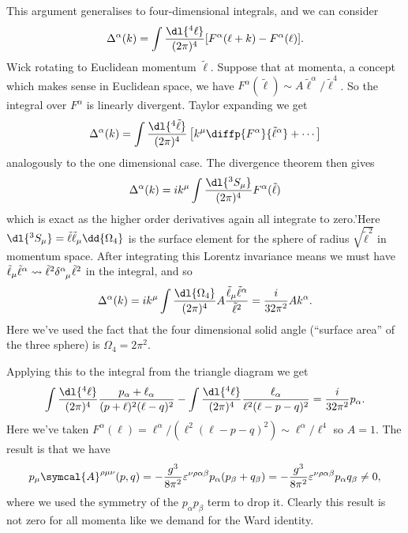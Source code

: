 \documentclass[fleqn]{NotesClass}
\newcommand{\amplitude}{\symcal{A}}
\begin{document}
    This argument generalises to four-dimensional integrals, and we can consider
    \begin{equation}
        \Delta^\alpha(k) = \int \frac{\dl{^4\ell}}{(2\pi)^4} [F^\alpha(\ell + k) - F^\alpha(\ell)].
    \end{equation}
    Wick rotating to Euclidean momentum \(\tilde{\ell}\). 
    Suppose that at momenta, a concept which makes sense in Euclidean space, we have \(F^\alpha(\tilde{\ell}) \sim A\tilde{\ell}^\alpha/\tilde{\ell}^4\).
    So the integral over \(F^\alpha\) is linearly divergent.
    Taylor expanding we get
    \begin{equation}
        \Delta^\alpha(k) = \int \frac{\dl{^4\tilde{\ell}}}{(2\pi)^4} \left[ k^\mu \diffp{F^\alpha}{\tilde{\ell}^\alpha}  + \dotsb \right]
    \end{equation}
    analogously to the one dimensional case.
    The divergence theorem then gives
    \begin{equation}
        \Delta^\alpha(k) = ik^\mu \int \frac{\dl{^3S_\mu}}{(2\pi)^4} F^\alpha(\tilde{\ell})
    \end{equation}
    which is exact as the higher order derivatives again all integrate to zero.'Here \(\dl{^3S_\mu} = \tilde{\ell}\tilde{\ell}_\mu \dd{\Omega_4}\) is the surface element for the sphere of radius \(\sqrt{\tilde{\ell}^2}\) in momentum space.
    After integrating this Lorentz invariance means we must have \(\tilde{\ell}_\mu \tilde{\ell}^\alpha \rightsquigarrow \tilde{\ell}^2 \tensor{\delta}{^\alpha_\mu}\tilde{\ell}^2\) in the integral, and so
    \begin{equation}
        \Delta^\alpha(k) = ik^\mu \int \frac{\dl{\Omega_4}}{(2\pi)^4} A\frac{\tilde{\ell}_\mu \tilde{\ell}^\alpha}{\tilde{\ell}^2} = \frac{i}{32\pi^2} Ak^\alpha.
    \end{equation}
    Here we've used the fact that the four dimensional solid angle (\enquote{surface area} of the three sphere) is \(\Omega_4 = 2\pi^2\).
    
    Applying this to the integral from the triangle diagram we get
    \begin{equation}
        \int \frac{\dl{^4\ell}}{(2\pi)^4} \frac{p_\alpha + \ell_\alpha}{(p + \ell)^2(\ell - q)^2} - \int \frac{\dl{^4\ell}}{(2\pi)^4} \frac{\ell_\alpha}{\ell^2(\ell - p - q)^2} = \frac{i}{32\pi^2}p_\alpha.
    \end{equation}
    Here we've taken \(F^\alpha(\ell) = \ell^\alpha/(\ell^2(\ell - p - q)^2) \sim \ell^\alpha/\ell^4\) so \(A = 1\).
    The result is that we have
    \begin{equation}
        p_\mu \amplitude^{\rho\mu\nu}(p, q) = -\frac{g^3}{8\pi^2} \varepsilon^{\nu\rho\alpha\beta} p_\alpha(p_\beta + q_\beta) = -\frac{g^3}{8\pi^2}\varepsilon^{\nu\rho\alpha\beta}p_\alpha q_\beta \ne 0,
    \end{equation}
    where we used the symmetry of the \(p_\alpha p_\beta\) term to drop it.
    Clearly this result is not zero for all momenta like we demand for the Ward identity.
    
\end{document}
